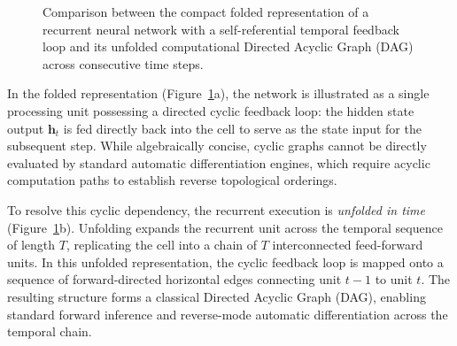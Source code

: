 \documentclass[../../main.tex]{subfiles}
\begin{document}
\begin{figure}[htbp]
\caption{Comparison between the compact folded representation of a recurrent neural network with a self-referential temporal feedback loop and its unfolded computational Directed Acyclic Graph (DAG) across consecutive time steps.}
\label{fig:rnn_folded_unrolled}
\end{figure}

In the folded representation (Figure~\ref{fig:rnn_folded_unrolled}a), the network is illustrated as a single processing unit possessing a directed cyclic feedback loop: the hidden state output $\mathbf{h}_t$ is fed directly back into the cell to serve as the state input for the subsequent step. While algebraically concise, cyclic graphs cannot be directly evaluated by standard automatic differentiation engines, which require acyclic computation paths to establish reverse topological orderings.

To resolve this cyclic dependency, the recurrent execution is \textit{unfolded in time} (Figure~\ref{fig:rnn_folded_unrolled}b). Unfolding expands the recurrent unit across the temporal sequence of length $T$, replicating the cell into a chain of $T$ interconnected feed-forward units. In this unfolded representation, the cyclic feedback loop is mapped onto a sequence of forward-directed horizontal edges connecting unit $t-1$ to unit $t$. The resulting structure forms a classical Directed Acyclic Graph (DAG), enabling standard forward inference and reverse-mode automatic differentiation across the temporal chain.
\end{document}

